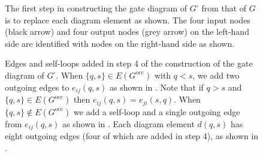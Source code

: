 \documentclass[../thesis-main/thesis-main]{subfiles}
\begin{document}
\begin{figure}
\centering
  
\caption[Step 1 in $G^\square$ construction]{The first step in constructing the gate diagram of $G^{\square}$
from that of $G$ is to replace each diagram element as shown. The
four input nodes (black arrow) and four output nodes (grey arrow)
on the left-hand side are identified with nodes on the right-hand
side as shown.\label{fig:replace_gate_diagram}}
\end{figure}

\begin{figure}
\centering
{}
\hspace{.5cm}
\hspace{.5cm}
\caption[Step 4 in $G^\square$ construction]{Edges and self-loops added in step 4 of the construction of the gate diagram of $G^{\square}$. When $\{q,s\}\in E(G^{\text{occ}})$ with $q<s$, we add two outgoing edges to $e_{ij}(q,s)$ as shown in . Note that if $q>s$ and $\{q,s\}\in E(G^{\text{occ}})$ then $e_{ij}(q,s)=e_{ji}(s,q)$. When $\{q,s\}\notin E(G^{\text{occ}})$ we add a self-loop and a single outgoing edge from $e_{ij}(q,s)$ as shown in . Each diagram element $d(q,s)$ has eight outgoing edges (four of which are added in step 4), as shown in .\label{fig:add_edges}}
\end{figure}
\end{document}
